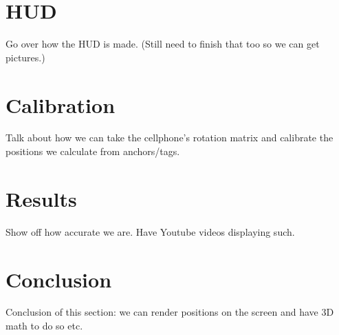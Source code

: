 \section{HUD}
Go over how the HUD is made. (Still need to finish that too so we can get pictures.)

\section{Calibration}
Talk about how we can take the cellphone's rotation matrix and calibrate the positions we calculate from anchors/tags.

\section{Results}
Show off how accurate we are. Have Youtube videos displaying such.

\section{Conclusion}
Conclusion of this section: we can render positions on the screen and have 3D math to do so etc.
